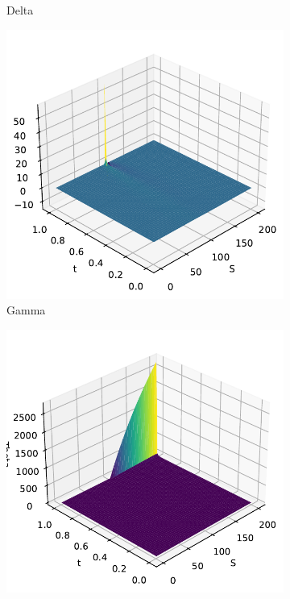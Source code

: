 \begin{figure}[H]
\begin{subfigure}[b]{0.3\linewidth}
        \caption{Delta}
    \end{subfigure}
    \begin{subfigure}[b]{0.3\linewidth}
        \includegraphics[width=\linewidth]{Imagenes/Parte1/6_Sols/Binary_Call/Binary_Call_Gamma.pdf}
        \caption{Gamma}
    \end{subfigure}
    \begin{subfigure}[b]{0.3\linewidth}
        \includegraphics[width=\linewidth]{Imagenes/Parte1/6_Sols/Binary_Call/Binary_Call_Theta.pdf}

\end{subfigure}
\end{figure}

